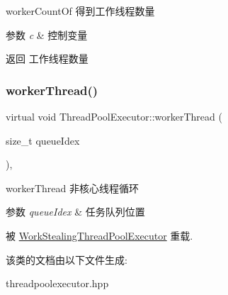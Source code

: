 worker\+Count\+Of 得到工作线程数量 


\begin{DoxyParams}{参数}
{\em c} & 控制变量\\
\hline
\end{DoxyParams}
\begin{DoxyReturn}{返回}
工作线程数量 
\end{DoxyReturn}
\mbox{\label{classThreadPoolExecutor_a844902ce61fb16b11a569b8ee56e80e9}} 
\subsubsection{\texorpdfstring{worker\+Thread()}{workerThread()}}
{\footnotesize\ttfamily virtual void Thread\+Pool\+Executor\+::worker\+Thread (\begin{DoxyParamCaption}\item[{size\+\_\+t}]{queue\+Idex }\end{DoxyParamCaption})\hspace{0.3cm}{\ttfamily [protected]}, {\ttfamily [virtual]}}



worker\+Thread 非核心线程循环 


\begin{DoxyParams}{参数}
{\em queue\+Idex} & 任务队列位置 \\
\hline
\end{DoxyParams}


被 \hyperlink{classWorkStealingThreadPoolExecutor_ab0414f5e006e8fc523bfd35ba276f705}{Work\+Stealing\+Thread\+Pool\+Executor} 重载.



该类的文档由以下文件生成\+:\begin{DoxyCompactItemize}
\item 
threadpoolexecutor.\+hpp\end{DoxyCompactItemize}
